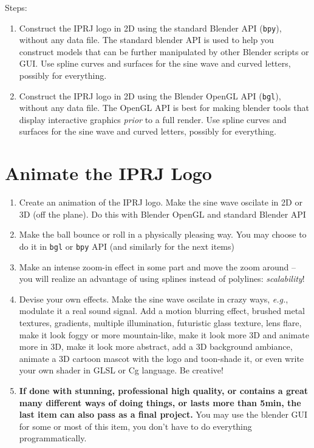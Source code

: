 \documentclass[a4paper]{article}
\newcommand{\eg}{{\it e.g.}}
\begin{document}
Steps:
\begin{enumerate}
\item Construct the IPRJ logo in 2D using the standard Blender API
(\texttt{bpy}), without any
data file. The standard blender API is used to help you construct models that
can be further manipulated by other Blender scripts or GUI. Use 
spline curves and surfaces for the sine wave and curved letters, possibly for everything.
\item Construct the IPRJ logo in 2D using the Blender OpenGL API
(\texttt{bgl}), without any
data file. The OpenGL API is best for making blender tools that display
interactive graphics
\emph{prior} to a full render. Use 
spline curves and surfaces for the sine wave and curved letters, possibly for everything.
\end{enumerate}

\section{Animate the IPRJ Logo}
\begin{enumerate}
\item Create an animation of the IPRJ logo. Make the sine wave oscilate in 2D or 
3D (off the plane). Do this with Blender OpenGL and standard Blender API
\item Make the ball bounce or roll in a physically pleasing way. You may choose
to do it in \texttt{bgl} or \texttt{bpy} API (and similarly for the next items)
\item Make an intense zoom-in effect in some part and move the zoom around --
you will realize an advantage of
using splines instead of polylines: \emph{scalability}!
\item Devise your own effects. Make the sine wave oscilate in crazy ways,
\eg, modulate it a real sound signal. Add a motion blurring effect, brushed
metal textures, gradients, multiple illumination, futuristic glass texture, lens
flare, make it look foggy or more mountain-like, make it look more 3D and
animate more in 3D, make it look more
abstract, add a 3D background ambiance, animate a 3D cartoon mascot with the
logo and toon-shade it, or even write your own shader in GLSL or Cg language. Be creative!
\item \textbf{If done with
stunning, professional high quality, or contains a great many different ways of
doing things, or lasts more than 5min, the last item can also pass as a final project.}
You may use the blender GUI for some or most of this item, you don't have to do everything programmatically.
\end{enumerate}



\end{document}
